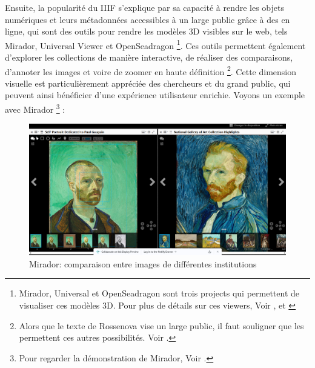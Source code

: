     Ensuite, la popularité du IIIF s'explique par sa capacité à rendre les objets numériques et leurs métadonnées accessibles à un large public grâce à des  en ligne, qui sont des outils pour rendre les modèles 3D visibles sur le web, tels Mirador, Universal Viewer et OpenSeadragon \footnote{Mirador, Universal et OpenSeadragon sont trois projects \opso qui permettent de visualiser ces modèles 3D. Pour plus de détails sur ces viewers, Voir \cite{mirador}, \cite{universalviewer} et \cite{openseadragon}}. Ces outils permettent également d'explorer les collections de manière interactive, de réaliser des comparaisons, d'annoter les images et voire de zoomer en haute définition \footnote{Alors que le texte de Rossenova vise un large public, il faut souligner que les  permettent ces autres possibilités. Voir \cite{rossenova2023iiif}.}. Cette dimension visuelle est particulièrement appréciée des chercheurs et du grand public, qui peuvent ainsi bénéficier d'une expérience utilisateur enrichie. Voyons un exemple avec Mirador \footnote{Pour regarder la démonstration de Mirador, Voir \cite{mirador_demo}.} :

        \begin{figure}[h!]
            \centering
            \includegraphics[width=12cm]{02_images/part_01/11_mirador_01.png}
            \caption{Mirador: comparaison entre images de différentes institutions}
        \end{figure}

